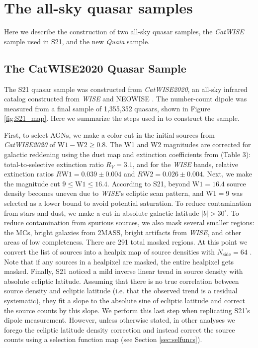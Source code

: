 \documentclass[modern]{aastex631}
\newcommand{\catwise}{\textsl{CatWISE}\xspace}
\newcommand{\catwisetwentytwenty}{\textsl{CatWISE2020}\xspace}
\newcommand{\quaia}{\textsl{Quaia}\xspace}
\newcommand{\wise}{\textsl{WISE}\xspace}
\newcommand{\w}{\mathrm{W}}
\begin{document}
\section{The all-sky quasar samples}
\label{sec:data}

Here we describe the construction of two all-sky quasar samples, the \catwise sample used in S21, and the new \quaia sample.

\subsection{The CatWISE2020 Quasar Sample}
\label{sec:catwise}
The S21 quasar sample was constructed from \catwisetwentytwenty, an all-sky infrared catalog constructed from \wise and NEOWISE \citep{marocco_catwise2020_2021}.
The number-count dipole was measured from a final sample of 1,355,352 quasars, shown in Figure \ref{fig:S21_map}.
Here we summarize the steps used in \citet{secrest_test_2021} to construct the sample.

First, to select AGNs, we make a color cut in the initial sources from \catwisetwentytwenty of $\w 1-\w 2\geq0.8$.
The W1 and W2 magnitudes are corrected for galactic reddening using the \citet{planck_collaboration_planck_2014} dust map and extinction coefficients from \citet{wang_optical_2019} (Table 3): total-to-selective extinction ratio $R_V=3.1$, and for the \wise bands, relative extinction ratios $R\w 1=0.039\pm 0.004$ and $R\w 2=0.026\pm 0.004$.
Next, we make the magnitude cut $9\leq\w 1\leq 16.4$. According to S21, beyond $\w 1=16.4$ source density becomes uneven due to \wise's ecliptic scan pattern, and $\w 1=9$ was selected as a lower bound to avoid potential saturation.
To reduce contamination from stars and dust, we make a cut in absolute galactic latitude $\vert b\vert > 30^\circ$.
To reduce contamination from spurious sources, we also mask several smaller regions: the MCs, bright galaxies from 2MASS, bright artifacts from \wise, and other areas of low completeness.
There are 291 total masked regions.
At this point we convert the list of sources into a healpix map of source densities with $N_\mathrm{side}=64$ \citep{gorski_healpix_2005}.
Note that if any sources in a healpixel are masked, the entire healpixel gets masked.
Finally, S21 noticed a mild inverse linear trend in source density with absolute ecliptic latitude.
Assuming that there is no true correlation between source density and ecliptic latitude (i.e. that the observed trend is a residual systematic), they fit a slope to the absolute sine of ecliptic latitude and correct the source counts by this slope.
We perform this last step when replicating S21's dipole measurement.
However, unless otherwise stated, in other analyses we forego the ecliptic latitude density correction and instead correct the source counts using a selection function map (see Section \ref{sec:selfuncs}).
\end{document}
